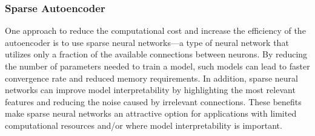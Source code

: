 \subsubsection{Sparse Autoencoder}\label{sec: sae}
One approach to reduce the computational cost and increase the efficiency of the autoencoder is to use sparse neural networks---a type of neural network that utilizes only a fraction of the available connections between neurons. By reducing the number of parameters needed to train a model, such models can lead to faster convergence rate and reduced memory requirements. In addition, sparse neural networks can improve model interpretability by highlighting the most relevant features and reducing the noise caused by irrelevant connections. These benefits make sparse neural networks an attractive option for applications with limited computational resources and/or where model interpretability is important. 

